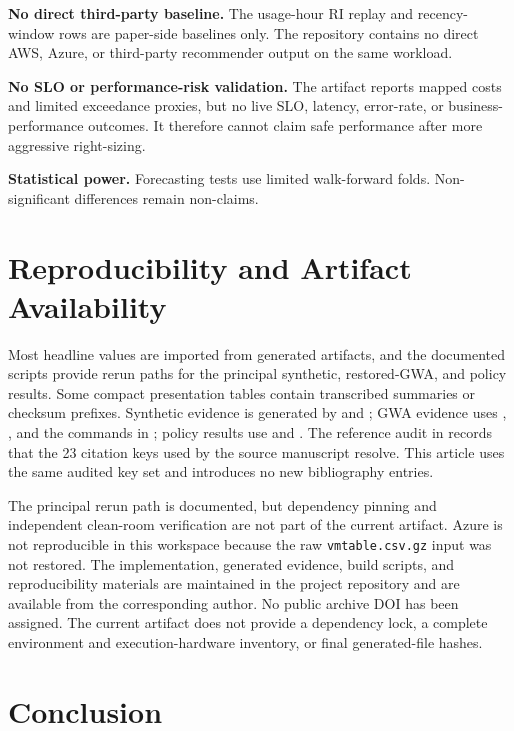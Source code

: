 \documentclass[11pt]{article}
\begin{document}
\textbf{No direct third-party baseline.} The usage-hour RI replay and
recency-window rows are paper-side baselines only. The repository contains no
direct AWS, Azure, or third-party recommender output on the same workload.

\textbf{No SLO or performance-risk validation.} The artifact reports mapped
costs and limited exceedance proxies, but no live SLO, latency, error-rate, or
business-performance outcomes. It therefore cannot claim safe performance
after more aggressive right-sizing.

\textbf{Statistical power.} Forecasting tests use limited walk-forward folds.
Non-significant differences remain non-claims.

\section{Reproducibility and Artifact Availability}

Most headline values are imported from generated artifacts, and the
documented scripts provide rerun paths for the principal synthetic,
restored-GWA, and policy results. Some compact presentation tables contain
transcribed summaries or checksum prefixes. Synthetic evidence is generated
by  and
; GWA evidence uses
,
, and the commands in
; policy results use
 and . The reference
audit in  records that the 23 citation keys used
by the source manuscript resolve. This article uses the same audited key set
and introduces no new bibliography entries.

The principal rerun path is documented, but dependency pinning and independent
clean-room verification are not part of the current artifact. Azure is not
reproducible in this workspace because the raw \texttt{vmtable.csv.gz} input
was not restored. The implementation, generated evidence, build scripts, and
reproducibility materials are maintained in the project repository and are
available from the corresponding author. No public archive DOI has been
assigned. The current artifact does not provide a dependency lock, a complete
environment and execution-hardware inventory, or final generated-file hashes.

\section{Conclusion}
\end{document}
